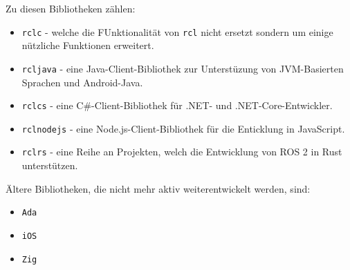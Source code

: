\noindent
Zu diesen Bibliotheken zählen:\\
\begin{itemize}
    \item \texttt{rclc} - welche die FUnktionalität von \texttt{rcl} nicht ersetzt sondern um einige nützliche Funktionen erweitert.\\
    \item \texttt{rcljava} - eine Java-Client-Bibliothek zur Unterstüzung von \ac{JVM}-Basierten Sprachen und Android-Java.\\
    \item \texttt{rclcs} - eine C\#-Client-Bibliothek für .NET- und .NET-Core-Entwickler.\\
    \item \texttt{rclnodejs} - eine Node.js-Client-Bibliothek für die Enticklung in JavaScript.\\
    \item \texttt{rclrs} - eine Reihe an Projekten, welch die Entwicklung von \ac{ROS} 2 in Rust unterstützen.\\
\end{itemize}
Ältere Bibliotheken, die nicht mehr aktiv weiterentwickelt werden, sind:\\
\begin{itemize}
    \item \texttt{Ada}
    \item \texttt{iOS}
    \item \texttt{Zig}
\end{itemize}


